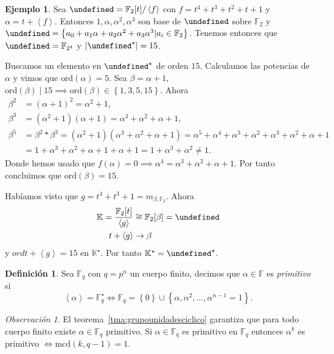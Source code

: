 \documentclass[10pt, spanish]{report}
\theoremstyle{definition}
\newtheorem*{defin}{Definición}
\newtheorem*{ej}{Ejemplo}
\theoremstyle{custom}
\theoremstyle{remark}
\newtheorem*{obs}{Observación}
\newcommand{\F}{\mathbb{F}}
\newcommand{\K}{\mathbb{K}}
\let\L\undefined
\newcommand{\L}{\mathbb{L}}
\newcommand{\ord}[1]{\text{ord}(#1)}
\newcommand{\mcd}[1]{\text{mcd}(#1)}
\newcommand{\fecha}[1]{\marginpar{\underline{\footnotesize{#1}}}}
\begin{document}
\fecha{17/03}
\begin{ej}
    Sea $\L=\F_2[t]/\left<f\right>$ con $f=t^4+t^3+t^2+t+1$ y $\alpha=t+\left<f
    \right>$. Entonces $1,\alpha,\alpha^2,\alpha^3$ son base de $\L$ sobre
    $\F_2$ y $\L=\left\{a_0+a_1\alpha+a_2\alpha^2+a_3\alpha^3|a_i\in\F_2
    \right\}$. Tenemos entonces que $\L=\F_{2^4}$ y $\left|\L^\star\right|=15$.

    Buscamos un elemento en $\L^\star$ de orden $15$. Calculamos las potencias
    de $\alpha$ y vimos que $\ord{\alpha}=5$. Sea $\beta=\alpha+1$, $\ord{\beta}
    \mid 15\implies\ord{\beta}\in\left\{1,3,5,15\right\}$. Ahora
    \begin{align*}
        \beta^2&=(\alpha+1)^2=\alpha^2+1,\\
        \beta^3&=(\alpha^2+1)(\alpha+1)=\alpha^3+\alpha^2+\alpha+1,\\
        \beta^5&=\beta^2*\beta^3=(\alpha^2+1)(\alpha^3+\alpha^2+\alpha+1)=
        \alpha^5+\alpha^4+\alpha^3+\alpha^2+\alpha^3+\alpha^2+\alpha+1\\
               &=1+\alpha^3+\alpha^2+\alpha+1+\alpha+1=1+\alpha^3+\alpha^2\neq1
    .\end{align*}
    Donde hemos usado que $f(\alpha)=0\implies
    \alpha^4=\alpha^3+\alpha^2+\alpha+1$. Por tanto concluimos que
    $\ord{\beta}=15$.

    Habíamos visto que $g=t^4+t^3+1=m_{\beta,\F_2}$. Ahora
    \begin{align*}
        \K=\frac{\F_2[t]}{\left<g\right>}&\cong\F_2[\beta]=\L\\
        t+\left<g\right>&\to\beta
    \end{align*}
    y $ord{t+\left< g \right>}=15$ en $\K^\star$. Por tanto $\K^\star=\L^\star$.
\end{ej}

\begin{defin}
    Sea $\F_q$ con $q=p^n$ un cuerpo finito, decimos que $\alpha\in\F$ es
    \textit{primitivo} si \[\left<\alpha\right>=\F_q^\star\Leftrightarrow \F_q
    =\left\{0\right\}\cup\left\{\alpha,\alpha^2,\ldots,\alpha^{n-1}=1\right\}.\]
\end{defin}

\begin{obs}
    El teorema~\ref{tma:grupounidadesciclico} garantiza que para todo cuerpo
    finito existe $\alpha\in\F_q$ primitivo. Si $\alpha\in\F_q$ es primitivo en
    $\F_q$ entonces $\alpha^k$ es primitivo $\Leftrightarrow\mcd{k,q-1}=1$.
\end{obs}
\end{document}
